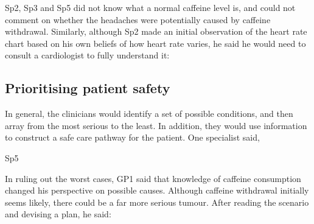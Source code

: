 \documentclass{sigchi}
\begin{document}
Sp2, Sp3 and Sp5 did not know what a normal caffeine level is, and could not comment on whether the headaches were potentially caused by caffeine withdrawal. Similarly, although Sp2 made an initial observation of the heart rate chart based on his own beliefs of how heart rate varies, he said he would need to consult a cardiologist to fully understand it:


\subsection{Prioritising patient safety}

In general, the clinicians would identify a set of possible conditions, and then array from the most serious to the least.  In addition, they would use information to construct a safe care pathway for the patient.  One specialist said,





 {Sp5}



In ruling out the worst cases, GP1 said that knowledge of caffeine consumption changed his perspective on possible causes.  Although caffeine withdrawal initially seems likely, there could be a far more serious tumour. After reading the scenario and devising a plan, he said:
\end{document}
